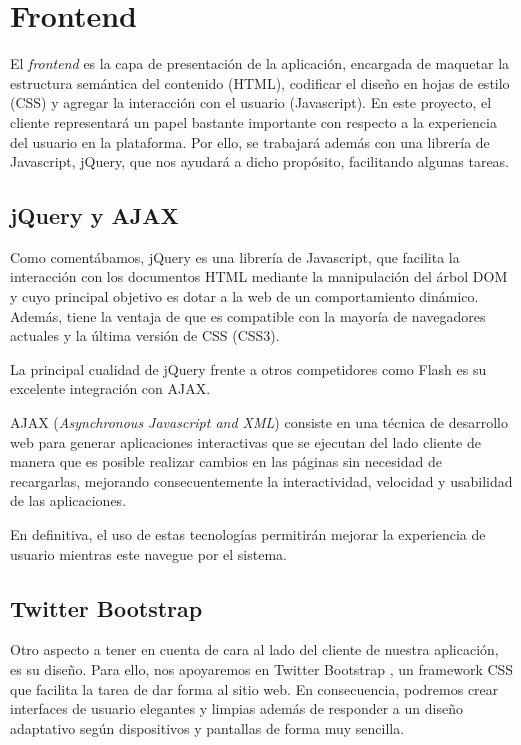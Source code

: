 \section{Frontend}
El \textit{frontend} es la capa de presentación de la aplicación, encargada de maquetar la estructura semántica del contenido (HTML), codificar el diseño en hojas de estilo (CSS) y agregar la interacción con el usuario (Javascript). En este proyecto, el cliente representará un papel bastante importante con respecto a la experiencia del usuario en la plataforma. Por ello, se trabajará además con una librería de Javascript, jQuery, que nos ayudará a dicho propósito, facilitando algunas tareas. 

\subsection{jQuery y AJAX}
Como comentábamos, jQuery \cite{jQuery} es una librería de Javascript, que facilita la interacción con los documentos HTML mediante la manipulación del árbol DOM y cuyo principal objetivo es dotar a la web de un comportamiento dinámico. Además, tiene la ventaja de que es compatible con la mayoría de navegadores actuales y la última versión de CSS (CSS3).

La principal cualidad de jQuery frente a otros competidores como Flash es su excelente integración con AJAX.

AJAX (\textit{Asynchronous Javascript and XML}) \cite{AJAX} consiste en una técnica de desarrollo web para generar aplicaciones interactivas que se ejecutan del lado cliente de manera que es posible realizar cambios en las páginas sin necesidad de recargarlas, mejorando consecuentemente la interactividad, velocidad y usabilidad de las aplicaciones.

En definitiva, el uso de estas tecnologías permitirán mejorar la experiencia de usuario mientras este navegue por el sistema.

\subsection{Twitter Bootstrap}
Otro aspecto a tener en cuenta de cara al lado del cliente de nuestra aplicación, es su diseño. Para ello, nos apoyaremos en Twitter Bootstrap \cite{Bootstrap}, un framework CSS que facilita la tarea de dar forma al sitio web. En consecuencia, podremos crear interfaces de usuario elegantes y limpias además de responder a un diseño adaptativo según dispositivos y pantallas de forma muy sencilla.

